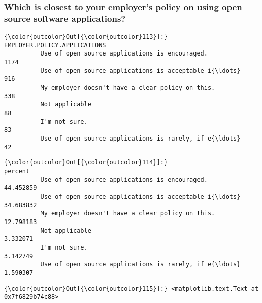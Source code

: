\documentclass[11pt]{article}
\begin{document}
    \subsubsection{Which is closest to your employer's policy on using open
source software
applications?}\label{which-is-closest-to-your-employers-policy-on-using-open-source-software-applications}


            \begin{Verbatim}[commandchars=\\\{\}]
{\color{outcolor}Out[{\color{outcolor}113}]:}                                                     EMPLOYER.POLICY.APPLICATIONS
          Use of open source applications is encouraged.                              1174
          Use of open source applications is acceptable i{\ldots}                           916
          My employer doesn't have a clear policy on this.                             338
          Not applicable                                                                88
          I'm not sure.                                                                 83
          Use of open source applications is rarely, if e{\ldots}                            42
\end{Verbatim}
        

            \begin{Verbatim}[commandchars=\\\{\}]
{\color{outcolor}Out[{\color{outcolor}114}]:}                                                       percent
          Use of open source applications is encouraged.      44.452859
          Use of open source applications is acceptable i{\ldots}  34.683832
          My employer doesn't have a clear policy on this.    12.798183
          Not applicable                                       3.332071
          I'm not sure.                                        3.142749
          Use of open source applications is rarely, if e{\ldots}   1.590307
\end{Verbatim}
        

            \begin{Verbatim}[commandchars=\\\{\}]
{\color{outcolor}Out[{\color{outcolor}115}]:} <matplotlib.text.Text at 0x7f6829b74c88>
\end{Verbatim}
        
    \begin{center}
    \end{center}
    { \hspace*{\fill} \\}
    
\end{document}
